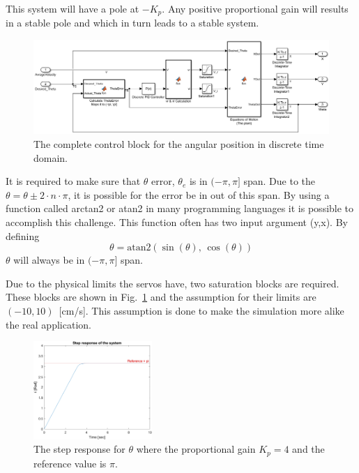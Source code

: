 This system will have a pole at $-K_p$.
Any positive proportional gain will results in a stable pole and which in turn leads to a stable system.
\begin{figure}[ht]
\centering
\includegraphics[width=\textwidth]{sections/assets/Theta_PID.PNG}
\caption{The complete control block for the angular position in discrete time domain.}
\label{fig:PID1}
\end{figure}

It is required to make sure that $\theta$ error, $\theta_e$ is in $(-\pi,\pi]$ span. Due to the $\theta = \theta \pm 2 \cdot n \cdot \pi$, it is possible for the error be in out of this span.
By using a function called arctan2 or atan2 in many programming languages it is possible to accomplish this challenge.
This function often has two input argument (y,x).
By defining
\begin{equation}
\theta = \text{atan2}(\sin(\theta),\, \cos(\theta))
\end{equation}
$\theta$ will always be in $(-\pi,\pi]$ span.

Due to the physical limits the servos have, two saturation blocks are required.
These blocks are shown in Fig.~\ref{fig:PID1} and the assumption for their limits are $(-10,10)$~[cm/s].
This assumption is done to make the simulation more alike the real application.
\begin{figure}[ht]
\centering
\includegraphics[width=0.4\textwidth]{sections/assets/Theta_pi_stepresponse.png}
\caption{The step response for $\theta$ where the proportional gain $K_p = 4$ and the reference value is $\pi$.}
\label{fig:Theta_Step}
\end{figure}

